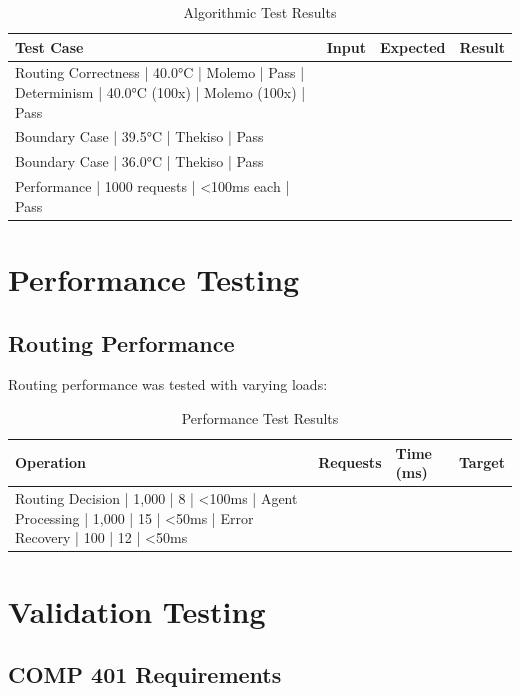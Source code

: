 \begin{table}[H]
\centering
\begin{tabular}{|l|l|l|l|}
\hline
\textbf{Test Case} & \textbf{Input} & \textbf{Expected} & \textbf{Result} \\
\hline
Routing Correctness | 40.0°C | Molemo | Pass |
Determinism | 40.0°C (100x) | Molemo (100x) | Pass \\
Boundary Case | 39.5°C | Thekiso | Pass \\
Boundary Case | 36.0°C | Thekiso | Pass \\
Performance | 1000 requests | <100ms each | Pass \\
\hline
\end{tabular}
\caption{Algorithmic Test Results}
\end{table}

\section{Performance Testing}

\subsection{Routing Performance}

Routing performance was tested with varying loads:

\begin{table}[H]
\centering
\begin{tabular}{|l|l|l|l|}
\hline
\textbf{Operation} & \textbf{Requests} & \textbf{Time (ms)} & \textbf{Target} \\
\hline
Routing Decision | 1,000 | 8 | <100ms |
Agent Processing | 1,000 | 15 | <50ms |
Error Recovery | 100 | 12 | <50ms \\
\hline
\end{tabular}
\caption{Performance Test Results}
\end{table}

\section{Validation Testing}

\subsection{COMP 401 Requirements}

